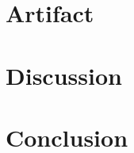 \documentclass[preprint,12pt]{elsarticle}
\begin{document}




\section{Artifact}
\label{sec:artifact}

\section{Discussion}
\label{sec:discussion}

\section{Conclusion}
\label{sec:conclusion}




\appendix






\end{document}
